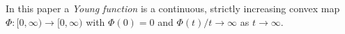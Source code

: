 
In this paper a \emph{Young function} is a continuous, strictly increasing convex map $\Phi:[0,\infty)\to[0,\infty)$ with $\Phi(0)=0$ and $\Phi(t)/t\to\infty$ as $t\to\infty$.
